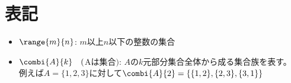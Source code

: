 \chapter{表記}
    \begin{itemize}
        \item $\range{m}{n}$: $m$以上$n$以下の整数の集合
        \item $\combi{A}{k}\quad($A$は集合)$: $A$の$k$元部分集合全体から成る集合族を表す。\\
        例えば$A=\{1,2,3\}$に対して$\combi{A}{2}=\{\{1,2\},\{2,3\},\{3,1\}\}$
    \end{itemize}